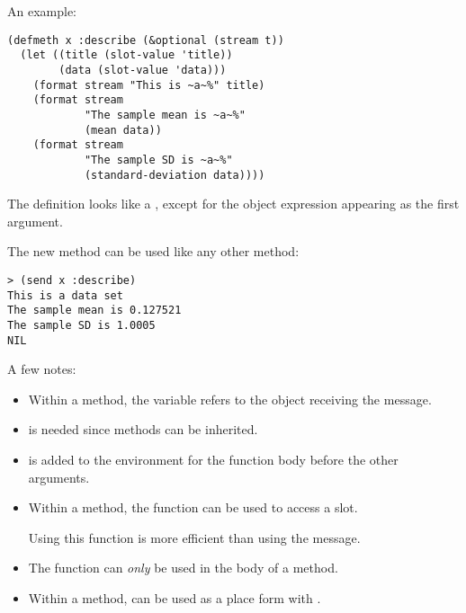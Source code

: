 \begin{slide}{}
An example:
{\Large
\begin{verbatim}
(defmeth x :describe (&optional (stream t))
  (let ((title (slot-value 'title))
        (data (slot-value 'data)))
    (format stream "This is ~a~%" title)
    (format stream
            "The sample mean is ~a~%"
            (mean data))
    (format stream
            "The sample SD is ~a~%"
            (standard-deviation data))))
\end{verbatim}}
The definition looks like a , except for the object
expression appearing as the first argument.

The new  method can be used like any other method:
{\Large
\begin{verbatim}
> (send x :describe)
This is a data set
The sample mean is 0.127521
The sample SD is 1.0005
NIL
\end{verbatim}}
\end{slide}

\begin{slide}{}
A few notes:
\begin{itemize}
\item
Within a method, the variable  refers to the object receiving
the message.
\item
{} is needed since methods can be inherited.
\item
{} is added to the environment for the function body before
the other arguments.
\item
Within a method, the function  can be used to access
a slot.

Using this function is more efficient than using the
 message.
\item
The  function can {\em only}\/ be used in the body of
a method.
\item
Within a method,  can be used as a place form with
.
\end{itemize}
\end{slide}

